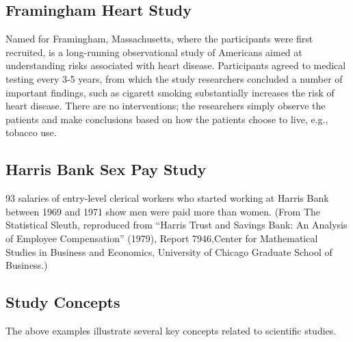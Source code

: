 \documentclass[]{book}
\begin{document}
\subsection{Framingham Heart Study}\label{framingham-heart-study}

Named for Framingham, Massachusetts, where the participants were first
recruited, is a long-running observational study of Americans aimed at
understanding risks associated with heart disease. Participants agreed
to medical testing every 3-5 years, from which the study researchers
concluded a number of important findings, such as cigarett smoking
substantially increases the risk of heart disease. There are no
interventions; the researchers simply observe the patients and make
conclusions based on how the patients choose to live, e.g., tobacco use.

\subsection{Harris Bank Sex Pay Study}\label{harris-bank-sex-pay-study}

93 salaries of entry-level clerical workers who started working at
Harris Bank between 1969 and 1971 show men were paid more than women.
(From The Statistical Sleuth, reproduced from ``Harris Trust and Savings
Bank: An Analysis of Employee Compensation'' (1979), Report 7946,Center
for Mathematical Studies in Business and Economics, University of
Chicago Graduate School of Business.)

\subsection{Study Concepts}\label{study-concepts}

The above examples illustrate several key concepts related to scientific
studies.
\end{document}
